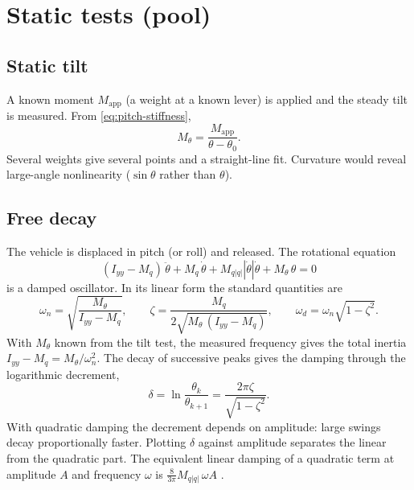 \section{Static tests (pool)}

\subsection{Static tilt}

A known moment $M_\mathrm{app}$ (a weight at a known lever) is applied and the steady tilt is
measured. From \eqref{eq:pitch-stiffness},
\begin{equation}
  M_\theta = \frac{M_\mathrm{app}}{\theta - \theta_0}.
\end{equation}
Several weights give several points and a straight-line fit. Curvature would reveal
large-angle nonlinearity ($\sin\theta$ rather than $\theta$).

\subsection{Free decay}

The vehicle is displaced in pitch (or roll) and released. The rotational equation
\begin{equation}
  (I_{yy} - M_{\dot q})\,\ddot\theta + M_q\,\dot\theta + M_{q|q|}|\dot\theta|\dot\theta + M_\theta\,\theta = 0
  \label{eq:free-decay}
\end{equation}
is a damped oscillator. In its linear form the standard quantities are
\begin{equation}
  \omega_n = \sqrt{\frac{M_\theta}{I_{yy} - M_{\dot q}}}, \qquad
  \zeta = \frac{M_q}{2\sqrt{M_\theta\,(I_{yy} - M_{\dot q})}}, \qquad
  \omega_d = \omega_n\sqrt{1-\zeta^2}.
\end{equation}
With $M_\theta$ known from the tilt test, the measured frequency gives the total inertia
$I_{yy} - M_{\dot q} = M_\theta/\omega_n^2$. The decay of successive peaks gives the damping
through the logarithmic decrement,
\begin{equation}
  \delta = \ln\frac{\theta_k}{\theta_{k+1}} = \frac{2\pi\zeta}{\sqrt{1-\zeta^2}} .
\end{equation}
With quadratic damping the decrement depends on amplitude: large swings decay
proportionally faster. Plotting $\delta$ against amplitude separates the linear from the
quadratic part. The equivalent linear damping of a quadratic term at amplitude $A$ and
frequency $\omega$ is $\tfrac{8}{3\pi}M_{q|q|}\,\omega A$ \cite[sec.~6.4]{fossen2011}.

